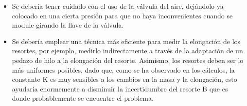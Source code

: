 \documentclass[../main.tex]{subfiles}
\begin{document}
\begin{itemize}
    \item 
    Se debería tener cuidado con el uso de la válvula del aire, dejándolo ya colocado
    en una cierta presión para que no haya inconvenientes cuando se module girando la llave 
    de la válvula.
    \item 
    Se debería emplear una técnica más eficiente para medir la elongación de los resortes, 
    por ejemplo, medirlo indirectamente a través de la adaptación de un pedazo de hilo a la 
    elongación del resorte. Asimismo, los resortes deben ser lo más uniformes posibles, dado 
    que, como se ha observado en los cálculos, la constante K es muy sensibles a los cambios 
    en la masa y la elongación, esto ayudaría enormemente a disminuir la incertidumbre del 
    resorte B que es donde probablemente se encuentre el problema.
\end{itemize}
\end{document}
